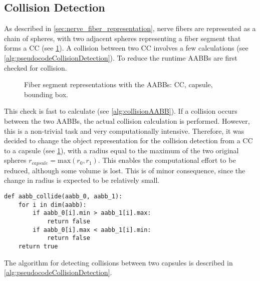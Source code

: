 \subsection{Collision Detection}
\label{sec:collisionDetection}
% 
As described in \cref{sec:nerve_fiber_representation}, nerve fibers are represented as a chain of spheres, with two adjacent spheres representing a fiber segment that forms a \ac{CC} (see \cref{fig:conical_capsule}).
A collision between two \ac{CC} involves a few calculations (see \cref{alg:pseudocodeCollisionDetection}).
To reduce the runtime \acp{AABB} are first checked for collision.
%
\begin{figure}[!t]
    \centering
    \setlength{\tikzwidth}{0.6\textwidth}
    \tikzset{external/export=false}
	\caption[]{Fiber segment representations with the \acp{AABB}: \raisebox{.25em}{\tikz \draw[black](0,0)--(0.275,0);} \ac{CC}, \raisebox{.25em}{\tikz \draw[blue, dash pattern=on 2.5pt off 2.5pt](0,0)--(0.275,0);} capsule, \raisebox{.25em}{\tikz \draw[red, dash pattern={on 2.5pt off 0.9pt on 0.42pt off 0.9pt}](0,0)--(0.275,0);} bounding box.}
	\label{fig:conical_capsule}
\end{figure}
%
This check is fast to calculate (see \cref{alg:collisionAABB}).
If a collision occurs between the two \acp{AABB}, the actual collision calculation is performed.
However, this is a non-trivial task and very computationally intensive.
Therefore, it was decided to change the object representation for the collision detection from a \ac{CC} to a capsule (see \cref{fig:conical_capsule}), with a radius equal to the maximum of the two original spheres $r_{\mathit{capsule}} = \mathrm{max}(r_0, r_1)$.
This enables the computational effort to be reduced, although some volume is lost.
This is of minor consequence, since the change in radius is expected to be relatively small.
\par
% 
\begin{lstfloat}[!tb]
    \lstset{style=python}
    \begin{lstlisting}[]
    def aabb_collide(aabb_0, aabb_1):
    for i in dim(aabb):
        if aabb_0[i].min > aabb_1[i].max:
            return false
        if aabb_0[i].max < aabb_1[i].min:
            return false
    return true
    \end{lstlisting}
    \caption{Calculation if a collision between \acp{AABB} exists.}
    \label{alg:collisionAABB}
\end{lstfloat}
% 
The algorithm for detecting collisions between two capsules is described in \cref{alg:pseudocodeCollisionDetection}.
